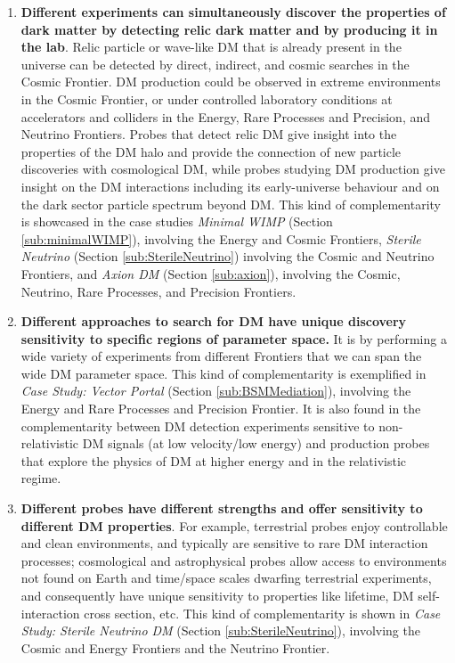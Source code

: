 \documentclass[nofootinbib]{article}
\begin{document}
\begin{enumerate}

\item \textbf{Different experiments can simultaneously discover the properties of dark matter by detecting relic dark matter and by producing it in the lab}. 
Relic particle or wave-like DM  that is already present in the universe can be detected by direct, indirect, and cosmic searches in the Cosmic Frontier. DM production could be observed in extreme environments in the Cosmic Frontier, or under controlled laboratory conditions at accelerators and colliders in the Energy, Rare Processes and Precision, and Neutrino Frontiers. Probes that detect relic DM give insight into the properties of the DM halo and provide the connection of new particle discoveries with cosmological DM, while probes studying DM production give insight on the DM interactions including its early-universe behaviour and on the dark sector particle spectrum beyond DM. 
This kind of complementarity is showcased in the case studies \textit{Minimal WIMP} (Section \ref{sub:minimalWIMP}), involving the Energy and Cosmic Frontiers, \textit{Sterile Neutrino} (Section \ref{sub:SterileNeutrino}) involving the Cosmic and Neutrino Frontiers, and \textit{Axion DM} (Section \ref{sub:axion}), involving the Cosmic, Neutrino, Rare Processes, and Precision Frontiers. 

\item \textbf{Different approaches to search for DM have unique discovery sensitivity to specific regions of parameter space.} It is by performing a wide variety of experiments from different Frontiers that we can span the wide DM parameter space. This kind of complementarity is exemplified in \textit{Case Study: Vector Portal} (Section \ref{sub:BSMMediation}), involving the Energy and Rare Processes and Precision Frontier. 
It is also found in the complementarity between DM detection experiments sensitive to non-relativistic DM signals (at low velocity/low energy) and production probes that explore the physics of DM at higher energy and in the relativistic regime.

\item \textbf{Different probes have different strengths and offer sensitivity to different DM properties}. 
For example, terrestrial probes enjoy controllable and clean environments, and typically are sensitive to rare DM interaction processes; cosmological and astrophysical probes allow access to environments not found on Earth and time/space scales dwarfing terrestrial experiments, and consequently have unique sensitivity to properties like lifetime, DM self-interaction cross section, etc. 
This kind of complementarity is shown in \textit{Case Study: Sterile Neutrino DM} (Section \ref{sub:SterileNeutrino}), involving the Cosmic and Energy Frontiers and the Neutrino Frontier. 


\end{enumerate}
\end{document}
